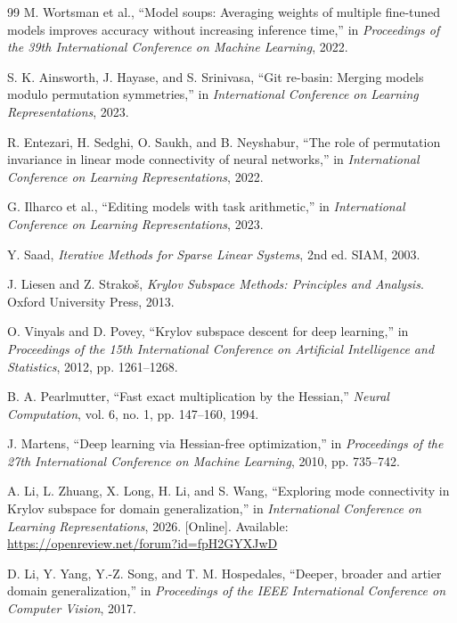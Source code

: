 \documentclass[11pt,a4paper]{article}
\begin{document}
\begin{thebibliography}{99}
M. Wortsman et al.,
``Model soups: Averaging weights of multiple fine-tuned models improves accuracy without increasing inference time,''
in \emph{Proceedings of the 39th International Conference on Machine Learning}, 2022.

S. K. Ainsworth, J. Hayase, and S. Srinivasa,
``Git re-basin: Merging models modulo permutation symmetries,''
in \emph{International Conference on Learning Representations}, 2023.

R. Entezari, H. Sedghi, O. Saukh, and B. Neyshabur,
``The role of permutation invariance in linear mode connectivity of neural networks,''
in \emph{International Conference on Learning Representations}, 2022.

G. Ilharco et al.,
``Editing models with task arithmetic,''
in \emph{International Conference on Learning Representations}, 2023.

Y. Saad, \emph{Iterative Methods for Sparse Linear Systems}, 2nd ed. SIAM, 2003.

J. Liesen and Z. Strako\v{s}, \emph{Krylov Subspace Methods: Principles and Analysis}. Oxford University Press, 2013.

O. Vinyals and D. Povey,
``Krylov subspace descent for deep learning,''
in \emph{Proceedings of the 15th International Conference on Artificial Intelligence and Statistics}, 2012, pp. 1261--1268.

B. A. Pearlmutter,
``Fast exact multiplication by the Hessian,''
\emph{Neural Computation}, vol. 6, no. 1, pp. 147--160, 1994.

J. Martens,
``Deep learning via Hessian-free optimization,''
in \emph{Proceedings of the 27th International Conference on Machine Learning}, 2010, pp. 735--742.

A. Li, L. Zhuang, X. Long, H. Li, and S. Wang,
``Exploring mode connectivity in Krylov subspace for domain generalization,''
in \emph{International Conference on Learning Representations}, 2026. [Online]. Available: \url{https://openreview.net/forum?id=fpH2GYXJwD}

D. Li, Y. Yang, Y.-Z. Song, and T. M. Hospedales,
``Deeper, broader and artier domain generalization,''
in \emph{Proceedings of the IEEE International Conference on Computer Vision}, 2017.


\end{thebibliography}
\end{document}
